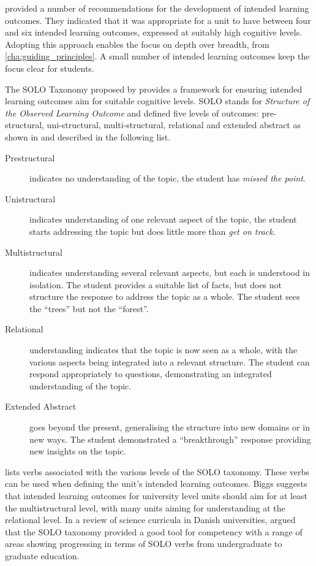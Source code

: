 \citet{Biggs:2007} provided a number of recommendations for the development of intended learning outcomes. They indicated that it was appropriate for a unit to have between four and six intended learning outcomes, expressed at suitably high cognitive levels. Adopting this approach enables the focus on depth over breadth,  from \cref{cha:guiding_principles}. A small number of intended learning outcomes keep the focus clear for students.

The SOLO Taxonomy proposed by \citet{Biggs:1982} provides a framework for ensuring intended learning outcomes aim for suitable cognitive levels. SOLO stands for \emph{Structure of the Observed Learning Outcome} and defined five levels of outcomes: pre-structural, uni-structural, multi-structural, relational and extended abstract as shown in  and described in the following list.

\begin{description}
 	\item[Prestructural] indicates no understanding of the topic, the student has \emph{missed the point}.
 	\item[Unistructural] indicates understanding of one relevant aspect of the topic, the student starts addressing the topic but does little more than \emph{get on track}.
 	\item[Multistructural] indicates understanding several relevant aspects, but each is understood in isolation. The student provides a suitable list of facts, but does not structure the response to address the topic as a whole. The student sees the ``trees'' but not the ``forest''.
 	\item[Relational] understanding indicates that the topic is now seen as a whole, with the various aspects being integrated into a relevant structure. The student can respond appropriately to questions, demonstrating an integrated understanding of the topic.
 	\item[Extended Abstract] goes beyond the present, generalising the structure into new domains or in new ways. The student demonstrated a ``breakthrough'' response providing new insights on the topic.
\end{description} 

 lists verbs associated with the various levels of the SOLO taxonomy. These verbs can be used when defining the unit's intended learning outcomes. Biggs suggests that intended learning outcomes for university level units should aim for at least the multistructural level, with many units aiming for understanding at the relational level. In a review of science curricula in Danish universities, \citet{Brabrand:2009} argued that the SOLO taxonomy provided a good tool for competency with a range of areas showing progressing in terms of SOLO verbs from undergraduate to graduate education.

